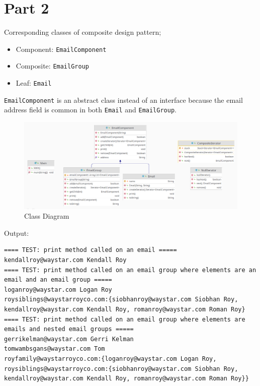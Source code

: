 \documentclass[a4paper]{article}
\begin{document}
\newpage
\section*{Part 2}
\label{sec:org3b06d54}

Corresponding classes of composite design pattern;
\begin{itemize}
\item Component: \texttt{EmailComponent}
\item Composite: \texttt{EmailGroup}
\item Leaf: \texttt{Email}
\end{itemize}

\texttt{EmailComponent} is an abstract class instead of an interface because the email address field is common in both \texttt{Email} and \texttt{EmailGroup}.


\begin{figure}[htbp]
\centering
\includegraphics[width=.9\linewidth]{org-img/Part_2/2021-12-11_22-21-10_screenshot.png}
\caption{Class Diagram}
\end{figure}


Output:

\begin{verbatim}
==== TEST: print method called on an email =====
kendallroy@waystar.com Kendall Roy
==== TEST: print method called on an email group where elements are an email and an email group =====
loganroy@waystar.com Logan Roy
roysiblings@waystarroyco.com:{siobhanroy@waystar.com Siobhan Roy, kendallroy@waystar.com Kendall Roy, romanroy@waystar.com Roman Roy}
==== TEST: print method called on an email group where elements are emails and nested email groups =====
gerrikelman@waystar.com Gerri Kelman
tomwambsgans@waystar.com Tom
royfamily@waystarroyco.com:{loganroy@waystar.com Logan Roy, roysiblings@waystarroyco.com:{siobhanroy@waystar.com Siobhan Roy, kendallroy@waystar.com Kendall Roy, romanroy@waystar.com Roman Roy}}
\end{verbatim}
\end{document}
